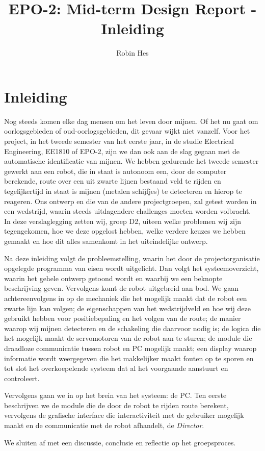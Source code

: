 \documentclass{report}
\title{EPO-2: Mid-term Design Report - Inleiding}
\author{Robin Hes}
\begin{document}
\chapter{Inleiding}
\label{ch:inleiding}

Nog steeds komen elke dag mensen om het leven door mijnen. Of het nu gaat om oorlogsgebieden of oud-oorlogsgebieden, dit gevaar wijkt niet vanzelf. Voor het project, in het tweede semester van het eerste jaar, in de studie Electrical Engineering, EE1810 of EPO-2, zijn we dan ook aan de slag gegaan met de automatische identificatie van mijnen. We hebben gedurende het tweede semester gewerkt aan een robot, die in staat is autonoom een, door de computer berekende, route over een uit zwarte lijnen bestaand veld te rijden en tegelijkertijd in staat is mijnen (metalen schijfjes) te detecteren en hierop te reageren. Ons ontwerp en die van de andere projectgroepen, zal getest worden in een wedstrijd, waarin steeds uitdagendere challenges moeten worden volbracht.
\\

\noindent
In deze verslaglegging zetten wij, groep D2, uiteen welke problemen wij zijn tegengekomen, hoe we deze opgelost hebben, welke verdere keuzes we hebben gemaakt en hoe dit alles samenkomt in het uiteindelijke ontwerp.

Na deze inleiding volgt de probleemstelling, waarin het door de projectorganisatie opgelegde programma van eisen wordt uitgelicht. Dan volgt het systeemoverzicht, waarin het gehele ontwerp getoond wordt en waarbij we een beknopte beschrijving geven.
Vervolgens komt de robot uitgebreid aan bod. We gaan achtereenvolgens in op de mechaniek die het mogelijk maakt dat de robot een zwarte lijn kan volgen; de eigenschappen van het wedstrijdveld en hoe wij deze gebruikt hebben voor positiebepaling en het volgen van de route; de manier waarop wij mijnen detecteren en de schakeling die daarvoor nodig is; de logica die het mogelijk maakt de servomotoren van de robot aan te sturen; de module die draadloze communicatie tussen robot en PC mogelijk maakt; een display waarop informatie wordt weergegeven die het makkelijker maakt fouten op te sporen en tot slot het overkoepelende systeem dat al het voorgaande aanstuurt en controleert.

Vervolgens gaan we in op het brein van het systeem: de PC. Ten eerste beschrijven we de module die de door de robot te rijden route berekent, vervolgens de  grafische interface die interactiviteit met de gebruiker mogelijk maakt en de communicatie met de robot afhandelt, de \textit{Director}.

We sluiten af met een discussie, conclusie en reflectie op het groepsproces.
\end{document}
